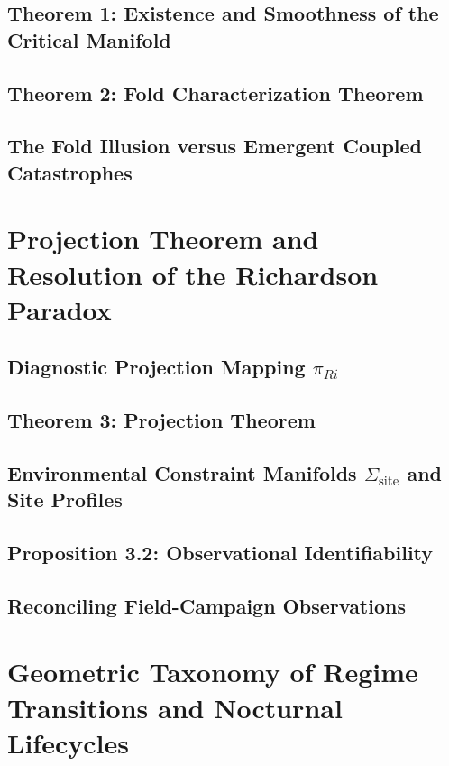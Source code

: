 \documentclass[11pt,letterpaper]{article}
\begin{document}
\subsection{Theorem 1: Existence and Smoothness of the Critical Manifold}

\subsection{Theorem 2: Fold Characterization Theorem}

\subsection{The Fold Illusion versus Emergent Coupled Catastrophes}

\section{Projection Theorem and Resolution of the Richardson Paradox}
\label{sec:projection}

\subsection{Diagnostic Projection Mapping $\pi_{Ri}$}

\subsection{Theorem 3: Projection Theorem}

\subsection{Environmental Constraint Manifolds $\Sigma_{\text{site}}$ and Site Profiles}

\subsection{Proposition 3.2: Observational Identifiability}

\subsection{Reconciling Field-Campaign Observations}

\section{Geometric Taxonomy of Regime Transitions and Nocturnal Lifecycles}
\label{sec:taxonomy}
\end{document}
